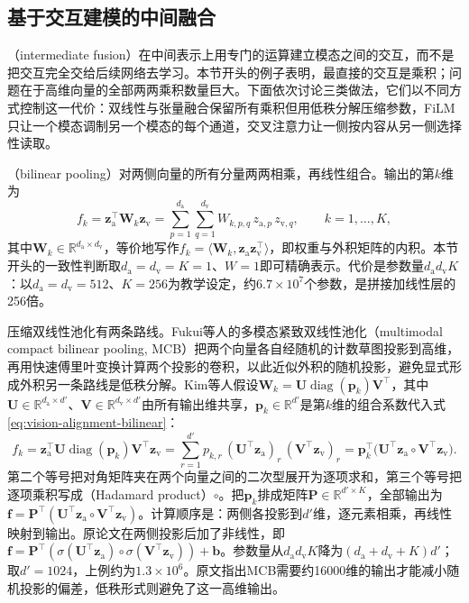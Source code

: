 \subsection{基于交互建模的中间融合}
\label{sec:vision-alignment-intermediate-fusion}

（intermediate fusion）在中间表示上用专门的运算建立模态之间的交互，而不是把交互完全交给后续网络去学习。本节开头的例子表明，最直接的交互是乘积；问题在于高维向量的全部两两乘积数量巨大。下面依次讨论三类做法，它们以不同方式控制这一代价：双线性与张量融合保留所有乘积但用低秩分解压缩参数，FiLM只让一个模态调制另一个模态的每个通道，交叉注意力让一侧按内容从另一侧选择性读取。

（bilinear pooling）对两侧向量的所有分量两两相乘，再线性组合。输出的第$k$维为
\begin{equation}
  f_k=\bm z_{\mathrm a}^\top\bm W_k\bm z_{\mathrm v}
  =\sum_{p=1}^{d_{\mathrm a}}\sum_{q=1}^{d_{\mathrm v}}W_{k,p,q}\,z_{\mathrm a,p}\,z_{\mathrm v,q},
  \qquad k=1,\ldots,K,
  \label{eq:vision-alignment-bilinear}
\end{equation}
其中$\bm W_k\in\mathbb R^{d_{\mathrm a}\times d_{\mathrm v}}$，等价地写作$f_k=\langle\bm W_k,\bm z_{\mathrm a}\bm z_{\mathrm v}^\top\rangle$，即权重与外积矩阵的内积。本节开头的一致性判断取$d_{\mathrm a}=d_{\mathrm v}=K=1$、$W=1$即可精确表示。代价是参数量$d_{\mathrm a}d_{\mathrm v}K$：以$d_{\mathrm a}=d_{\mathrm v}=512$、$K=256$为教学设定，约$6.7\times10^7$个参数，是拼接加线性层的256倍。

压缩双线性池化有两条路线。Fukui等人的多模态紧致双线性池化（multimodal compact bilinear pooling, MCB）把两个向量各自经随机的计数草图投影到高维，再用快速傅里叶变换计算两个投影的卷积，以此近似外积的随机投影，避免显式形成外积另一条路线是低秩分解。Kim等人假设$\bm W_k=\bm U\operatorname{diag}(\bm p_k)\bm V^\top$，其中$\bm U\in\mathbb R^{d_{\mathrm a}\times d'}$、$\bm V\in\mathbb R^{d_{\mathrm v}\times d'}$由所有输出维共享，$\bm p_k\in\mathbb R^{d'}$是第$k$维的组合系数代入式\eqref{eq:vision-alignment-bilinear}：
\[
  f_k=\bm z_{\mathrm a}^\top\bm U\operatorname{diag}(\bm p_k)\bm V^\top\bm z_{\mathrm v}
  =\sum_{r=1}^{d'}p_{k,r}\,(\bm U^\top\bm z_{\mathrm a})_r\,(\bm V^\top\bm z_{\mathrm v})_r
  =\bm p_k^\top\bigl(\bm U^\top\bm z_{\mathrm a}\circ\bm V^\top\bm z_{\mathrm v}\bigr).
\]
第二个等号把对角矩阵夹在两个向量之间的二次型展开为逐项求和，第三个等号把逐项乘积写成（Hadamard product）$\circ$。把$\bm p_k$排成矩阵$\bm P\in\mathbb R^{d'\times K}$，全部输出为$\bm f=\bm P^\top(\bm U^\top\bm z_{\mathrm a}\circ\bm V^\top\bm z_{\mathrm v})$。计算顺序是：两侧各投影到$d'$维，逐元素相乘，再线性映射到输出。原论文在两侧投影后加了非线性，即$\bm f=\bm P^\top(\sigma(\bm U^\top\bm z_{\mathrm a})\circ\sigma(\bm V^\top\bm z_{\mathrm v}))+\bm b$。参数量从$d_{\mathrm a}d_{\mathrm v}K$降为$(d_{\mathrm a}+d_{\mathrm v}+K)d'$；取$d'=1024$，上例约为$1.3\times10^6$。原文指出MCB需要约16000维的输出才能减小随机投影的偏差，低秩形式则避免了这一高维输出。

